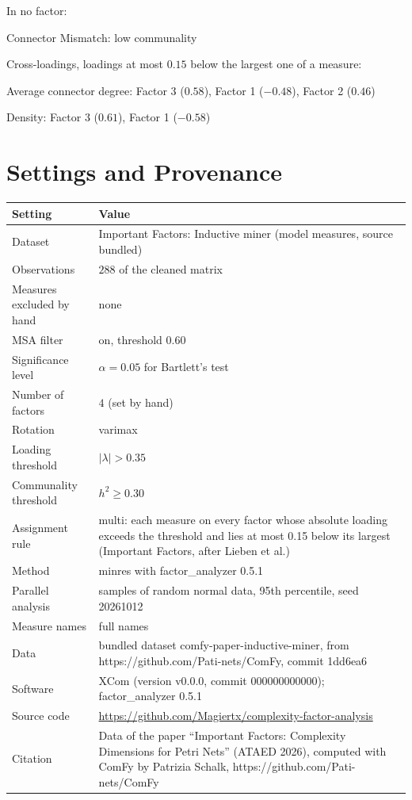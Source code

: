 \documentclass[a4paper]{article}
\begin{document}
\noindent
In no factor:
\begin{compactitem}
\item Connector Mismatch: low communality
\end{compactitem}

\noindent
Cross-loadings, loadings at most $0.15$ below the largest one of a measure:
\begin{compactitem}
\item Average connector degree: Factor 3 ($0.58$), Factor 1 ($-0.48$), Factor 2 ($0.46$)
\item Density: Factor 3 ($0.61$), Factor 1 ($-0.58$)
\end{compactitem}

\section*{Settings and Provenance}
\begin{center}
\begin{tabular}{@{}>{\raggedright\arraybackslash}p{4.2cm}>{\raggedright\arraybackslash}p{11.3cm}@{}}
\toprule
Setting & Value \\
\midrule
Dataset & Important Factors: Inductive miner (model measures, source bundled) \\
Observations & $288$ of the cleaned matrix \\
Measures excluded by hand & none \\
MSA filter & on, threshold $0.60$ \\
Significance level & $\alpha = 0.05$ for Bartlett's test \\
Number of factors & $4$ (set by hand) \\
Rotation & varimax \\
Loading threshold & $|\lambda| > 0.35$ \\
Communality threshold & $h^2 \geq 0.30$ \\
Assignment rule & multi: each measure on every factor whose absolute loading exceeds the threshold and lies at most 0.15 below its largest (Important Factors, after Lieben et al.) \\
Method & minres with factor\_analyzer 0.5.1 \\
Parallel analysis & 100 samples of random normal data, 95th percentile, seed 20261012 \\
Measure names & full names \\
Data & bundled dataset comfy-paper-inductive-miner, from https://github.com/Pati-nets/ComFy, commit 1dd6ea6 \\
Software & XCom (version v0.0.0, commit 000000000000); factor\_\allowbreak{}analyzer 0.5.1 \\
Source code & \url{https://github.com/Magiertx/complexity-factor-analysis} \\
Citation & Data of the paper ``Important Factors: Complexity Dimensions for Petri Nets'' (ATAED 2026), computed with ComFy by Patrizia Schalk, https://github.com/Pati-nets/ComFy \\
\bottomrule
\end{tabular}
\end{center}
\end{document}
